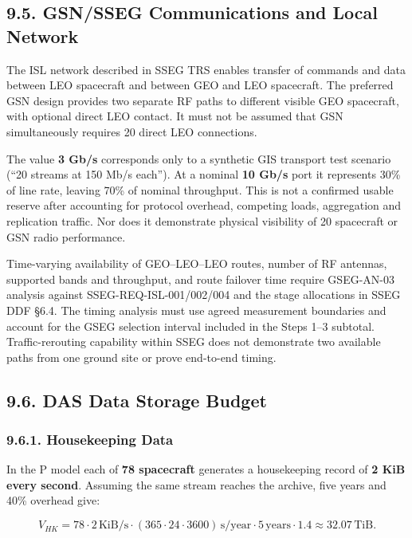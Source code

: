 \subsection{9.5. GSN/\allowbreak{}SSEG Communications and Local Network}\label{ddjf-9-5}

The ISL network described in SSEG TRS enables transfer of commands and data between LEO spacecraft and between GEO and LEO spacecraft. The preferred GSN design provides two separate RF paths to different visible GEO spacecraft, with optional direct LEO contact. It must not be assumed that GSN simultaneously requires 20 direct LEO connections.

The value \textbf{3 Gb/\allowbreak{}s} corresponds only to a synthetic GIS transport test scenario (“20 streams at 150 Mb/\allowbreak{}s each”). At a nominal \textbf{10 Gb/\allowbreak{}s} port it represents 30\% of line rate, leaving 70\% of nominal throughput. This is not a confirmed usable reserve after accounting for protocol overhead, competing loads, aggregation and replication traffic. Nor does it demonstrate physical visibility of 20 spacecraft or GSN radio performance.

Time-varying availability of GEO–LEO–LEO routes, number of RF antennas, supported bands and throughput, and route failover time require GSEG-AN-03 analysis against SSEG-REQ-ISL-001/\allowbreak{}002/\allowbreak{}004 and the stage allocations in SSEG DDF §6.4. The timing analysis must use agreed measurement boundaries and account for the GSEG selection interval included in the Steps 1--3 subtotal. Traffic-rerouting capability within SSEG does not demonstrate two available paths from one ground site or prove end-to-end timing.

\subsection{9.6. DAS Data Storage Budget}\label{ddjf-9-6}

\subsubsection{9.6.1. Housekeeping Data}\label{ddjf-9-6-1}

In the P model each of \textbf{78 spacecraft} generates a housekeeping record of \textbf{2 KiB every second}. Assuming the same stream reaches the archive, five years and 40\% overhead give:

\[
V_{HK}=78\cdot2\,\mathrm{KiB/s}\cdot(365\cdot24\cdot3600)\,\mathrm{s/year}\cdot5\,\mathrm{years}\cdot1.4\approx32.07\,\mathrm{TiB}.
\]

